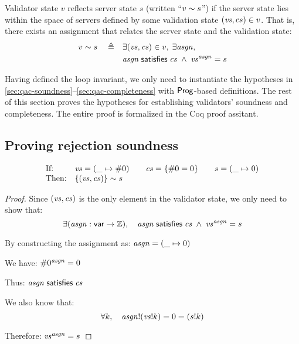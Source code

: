 \begin{definition}
Validator state $v$ reflects server state $s$ (written ``$v\sim s$'') if
the server state lies within the space of servers defined by some validation
state $(\mathit{vs},cs)\in v$.  That is, there exists an assignment that relates the
server state and the validation state:
\begin{align*}
v\sim s\quad\triangleq\quad&\exists(\mathit{vs},\mathit{cs})\in
  v,\;\exists\mathit{asgn},\\
  &\mathit{asgn}\;\mathsf{satisfies}\;\mathit{cs}\;\wedge\;\mathit{vs}^{\mathit{asgn}}=s
  \end{align*}
\end{definition}

Having defined the loop invariant, we only need to instantiate the hypotheses
in \autoref{sec:qac-soundness}--\ref{sec:qac-completeness} with $\mathsf{Prog}$-based
definitions.  The rest of this section proves the hypotheses for establishing
validators' soundness and completeness.  The entire proof is formalized in the
Coq proof assitant.

\subsection{Proving rejection soundness}
\label{sec:proof-sound}
\begin{lemma}[\ref{eq:rs1}]
\[\begin{array}{ll}
\text{If:}&
\mathit{vs}=(\_\mapsto\#0)\qquad
\mathit{cs}=\{\#0=0\}\qquad
s=(\_\mapsto0)\\
\text{Then:}&\{(\mathit{vs},\mathit{cs})\}\sim s
\end{array}\]
\end{lemma}
\begin{proof}
Since $(\mathit{vs},\mathit{cs})$ is the only element in the validator state, we only need to show
that:
\[\exists(\mathit{asgn}:\mathsf{var}\to\mathbb Z),\quad\mathit{asgn}\;\mathsf{satisfies}\;\mathit{cs}\;\wedge\;\mathit{vs}^{\mathit{asgn}}=s\]

By constructing the assignment as: \(\mathit{asgn}=(\_\mapsto0)\)

We have: \(\#0^{\mathit{asgn}}=0\)

Thus: \(\mathit{asgn}\;\mathsf{satisfies}\;\mathit{cs}\)

We also know that: \[\forall k, \quad\mathit{asgn}!(\mathit{vs}!k)=0=(s!k)\]

Therefore: \(\mathit{vs}^{\mathit{asgn}}=s\)
\end{proof}

